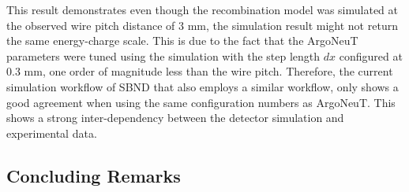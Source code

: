 This result demonstrates even though the recombination model was simulated at the observed wire pitch distance of 3 mm, the simulation result might not return the same energy-charge scale.
This is due to the fact that the ArgoNeuT parameters were tuned using the simulation with the step length $dx$ configured at 0.3 mm, one order of magnitude less than the wire pitch.
Therefore, the current simulation workflow of SBND that also employs a similar workflow, only shows a good agreement when using the same configuration numbers as ArgoNeuT. 
This shows a strong inter-dependency between the detector simulation and experimental data.

\subsection{Concluding Remarks}
\label{sec:concludeDeltaRay}



		
